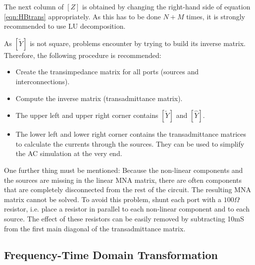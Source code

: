 The next column of $[Z]$ is obtained by changing the right-hand
side of equation \eqref{eqn:HBtrans} appropriately. As this has to
be done $N+M$ times, it is strongly recommended to use LU
decomposition.

\addvspace{12pt}

As $[\tilde{Y}]$ is not square, problems encounter by trying to
build its inverse matrix. Therefore, the following procedure is
recommended:
\begin{itemize}
\item Create the transimpedance matrix for all ports (sources
  and interconnections).
\item Compute the inverse matrix (transadmittance matrix).
\item The upper left and upper right corner contains $[\tilde{Y}]$
  and $[\hat{Y}]$.
\item The lower left and lower right corner contains the transadmittance
  matrices to calculate the currents through the sources. They
  can be used to simplify the AC simulation at the very end.
\end{itemize}


\addvspace{12pt}

One further thing must be mentioned: Because the non-linear
components and the sources are missing in the linear MNA matrix,
there are often components that are completely disconnected from
the rest of the circuit. The resulting MNA matrix cannot be
solved. To avoid this problem, shunt each port with a $100\Omega$
resistor, i.e. place a resistor in parallel to each non-linear
component and to each source. The effect of these resistors can
be easily removed by subtracting 10mS from the first main diagonal
of the transadmittance matrix.


\subsection{Frequency-Time Domain Transformation}

